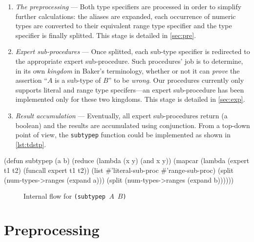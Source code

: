 \documentclass[format=sigconf]{acmart}
\newcommand\code[2][\small]{\sloppy\texttt{#1#2}}
\theoremstyle{definition}
\begin{document}
\begin{enumerate}
\item \emph{The preprocessing} --- Both type specifiers are processed in order to
  simplify further calculations: the aliases are expanded, each occurrence of
  numeric types are converted to their equivalent range type specifier and the
  type specifier is finally splitted. This stage is detailed in %
  \vref{sec:pre}.
\item \emph{Expert sub-procedures} --- Once splitted, each sub-type specifier is
  redirected to the appropriate expert sub-procedure. Such procedures' job is to
  determine, in its own \emph{kingdom} in Baker's terminology, whether or not it
  can \emph{prove} the assertion ``$A$ is a sub-type of $B$'' to be \emph{wrong}.
  Our procedures currently only supports literal and range type specifers---an
  expert sub-procedure has been implemented only for these two kingdoms. This
  stage is detailed in \vref{sec:exp}.
\item \emph{Result accumulation} --- Eventually, all expert sub-procedures
  return (a boolean) and the results are accumulated using conjunction.
  From a top-down point of view, the \code{subtypep} function could be
  implemented as shown in \vref{lst:tdstp}.
\end{enumerate}

\begin{listing}
\begin{clcode}
(defun subtypep (a b)
  (reduce (lambda (x y) (and x y))
          (mapcar (lambda (expert t1 t2)
                    (funcall expert t1 t2))
                  (list #'literal-sub-proc #'range-sub-proc)
                  (split (num-types->ranges (expand a)))
                  (split (num-types->ranges (expand b))))))
\end{clcode}
\caption{A top-down approach of \code{subtypep}}
\label{lst:tdstp}
\end{listing}

\begin{figure}
  \centering
  
  \caption{Internal flow for \code{(subtypep $A$ $B$)}}
  \label{fig:flow}
\end{figure}

\section{Preprocessing}
\label{sec:pre}
\end{document}
